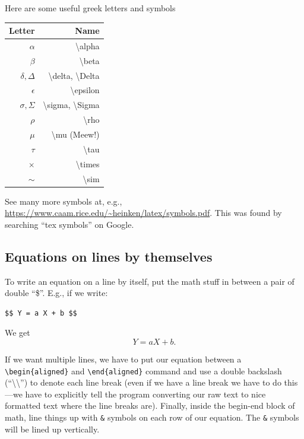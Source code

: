 \documentclass[
  letterpaper,
  DIV=11,
  numbers=noendperiod]{scrreprt}
\begin{document}
Here are some useful greek letters and symbols

\begin{longtable}[]{@{}rr@{}}
\toprule\noalign{}
Letter & Name \\
\midrule\noalign{}
\endhead
\bottomrule\noalign{}
\endlastfoot
\(\alpha\) & \textbackslash alpha \\
\(\beta\) & \textbackslash beta \\
\(\delta, \Delta\) & \textbackslash delta, \textbackslash Delta \\
\(\epsilon\) & \textbackslash epsilon \\
\(\sigma, \Sigma\) & \textbackslash sigma, \textbackslash Sigma \\
\(\rho\) & \textbackslash rho \\
\(\mu\) & \textbackslash mu (Meew!) \\
\(\tau\) & \textbackslash tau \\
\(\times\) & \textbackslash times \\
\(\sim\) & \textbackslash sim \\
\end{longtable}

See many more symbols at, e.g.,
\url{https://www.caam.rice.edu/~heinken/latex/symbols.pdf}. This was
found by searching ``tex symbols'' on Google.

\hypertarget{equations-on-lines-by-themselves}{%
\subsection{Equations on lines by
themselves}\label{equations-on-lines-by-themselves}}

To write an equation on a line by itself, put the math stuff in between
a pair of double ``\$''. E.g., if we write:

\begin{verbatim}
$$ Y = a X + b $$
\end{verbatim}

We get \[ Y = a X + b .\]

If we want multiple lines, we have to put our equation between a
\texttt{\textbackslash{}begin\{aligned\}} and
\texttt{\textbackslash{}end\{aligned\}} command and use a double
backslash (``\textbackslash\textbackslash{}'') to denote each line break
(even if we have a line break we have to do this---we have to explicitly
tell the program converting our raw text to nice formatted text where
the line breaks are). Finally, inside the begin-end block of math, line
things up with \texttt{\&} symbols on each row of our equation. The
\texttt{\&} symbols will be lined up vertically.
\end{document}
